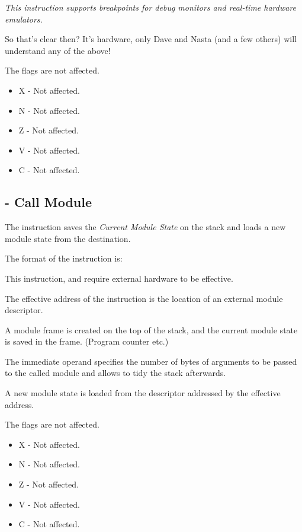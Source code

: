 \emph{This instruction supports breakpoints for debug monitors and real-time hardware emulators.}

So that's clear then? It's hardware, only Dave and Nasta (and a few others) will understand any of the above!

The flags are not affected.

\begin{itemize}
    \item X - Not affected.
    \item N - Not affected.
    \item Z - Not affected.
    \item V - Not affected.
    \item C - Not affected.
\end{itemize}


\subsection{ - Call Module}

The  instruction saves the \emph{Current Module State} on the stack and loads a new module state from the destination.

The format of the instruction is:


This instruction, and  require external hardware to be effective. 

The effective address of the instruction is the location of an external module
descriptor. 

A module frame is created on the top of the stack, and the current module
state is saved in the frame. (Program counter etc.)

The immediate operand specifies the number of bytes of arguments to be passed to the called module and allows  to tidy the stack afterwards.

A new module state is loaded from the descriptor addressed by the effective address.

The flags are not affected.

\begin{itemize}
	\item X - Not affected.
	\item N - Not affected.
	\item Z - Not affected.
	\item V - Not affected.
	\item C - Not affected.
\end{itemize}

